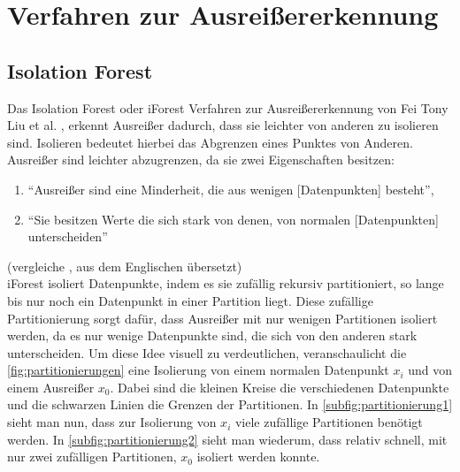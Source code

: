 \section{Verfahren zur Ausreißererkennung}

\subsection{Isolation Forest}
Das Isolation Forest oder iForest Verfahren zur Ausreißererkennung von Fei Tony Liu et al. \cite{iForest}, erkennt Ausreißer dadurch, dass sie leichter von anderen zu isolieren sind. Isolieren bedeutet hierbei das Abgrenzen eines Punktes von Anderen. Ausreißer sind leichter abzugrenzen, da sie zwei Eigenschaften besitzen:
\begin{enumerate}
    \item "`Ausreißer sind eine Minderheit, die aus wenigen [Datenpunkten] besteht"',
    \item "`Sie besitzen Werte die sich stark von denen, von normalen [Datenpunkten] unterscheiden"'
\end{enumerate}
(vergleiche \cite[Ch. 1]{iForest}, aus dem Englischen übersetzt) \\
iForest isoliert Datenpunkte, indem es sie zufällig rekursiv partitioniert, so lange bis nur noch ein Datenpunkt in einer Partition liegt. Diese zufällige Partitionierung sorgt dafür, dass Ausreißer mit nur wenigen Partitionen isoliert werden, da es nur wenige Datenpunkte sind, die sich von den anderen stark unterscheiden. Um diese Idee visuell zu verdeutlichen, veranschaulicht die \autoref{fig:partitionierungen} eine Isolierung von einem normalen Datenpunkt $x_i$ und von einem Ausreißer $x_0$. Dabei sind die kleinen Kreise die verschiedenen Datenpunkte und die schwarzen Linien die Grenzen der Partitionen. In \autoref{subfig:partitionierung1} sieht man nun, dass zur Isolierung von $x_i$ viele zufällige Partitionen benötigt werden. In \autoref{subfig:partitionierung2} sieht man wiederum, dass relativ schnell, mit nur zwei zufälligen Partitionen, $x_0$ isoliert werden konnte.
